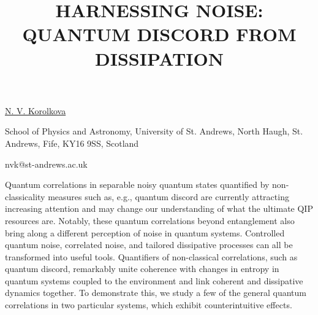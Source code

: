 \title{HARNESSING NOISE: QUANTUM DISCORD FROM DISSIPATION}

\underline{N. V. Korolkova}

{\normalsize{
\vspace{-4mm} School of Physics and Astronomy, University of St. Andrews, North Haugh, St. Andrews, Fife, KY16 9SS, Scotland

\email nvk@st-andrews.ac.uk}}

Quantum correlations in separable noisy quantum states quantified by non-classicality measures such as, e.g., quantum discord are currently attracting increasing attention and may change our understanding of what the ultimate QIP resources are. Notably, these quantum correlations beyond entanglement also bring along a different perception of noise in quantum systems. Controlled quantum noise, correlated noise, and tailored dissipative processes can all be transformed into useful tools. Quantifiers of non-classical correlations, such as quantum discord, remarkably unite coherence with changes in entropy in quantum systems coupled to the environment and link coherent and dissipative dynamics together. To demonstrate this, we study a few of the general quantum correlations in two particular systems, which exhibit counterintuitive effects.
				
\vspace{\baselineskip} 